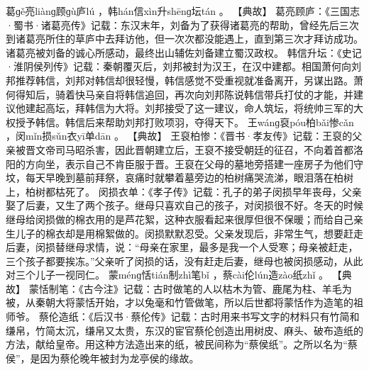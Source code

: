 \documentclass[12pt,UTF8]{ctexbook}
\begin{document}
葛ɡě亮liànɡ顾ɡù庐lú
，韩hán信xìn升shēnɡ坛tán
。
【典故】
葛亮顾庐：《三国志·蜀书·诸葛亮传》记载：东汉末年，刘备为了获得诸葛亮的帮助，曾经先后三次到诸葛亮所住的草庐中去拜访他，但一次次都没能遇上，直到第三次才拜访成功。诸葛亮被刘备的诚心所感动，最终出山辅佐刘备建立蜀汉政权。
韩信升坛：《史记·淮阴侯列传》记载：秦朝覆灭后，刘邦被封为汉王，在汉中建都。相国萧何向刘邦推荐韩信，刘邦对韩信却很轻慢，韩信感觉不受重视就准备离开，另谋出路。萧何得知后，骑着快马亲自将韩信追回，再次向刘邦陈说韩信带兵打仗的才能，并建议他建起高坛，拜韩信为大将。刘邦接受了这一建议，命人筑坛，将统帅三军的大权授予韩信。韩信后来帮助刘邦打败项羽，夺得天下。
王wánɡ裒póu柏bǎi惨cǎn
，闵mǐn损sǔn衣yī单dān
。
【典故】
王裒柏惨：《晋书·孝友传》记载：王裒的父亲被晋文帝司马昭杀害，因此晋朝建立后，王裒不接受朝廷的征召，不向着首都洛阳的方向坐，表示自己不肯臣服于晋。王裒在父母的墓地旁搭建一座房子为他们守坟，每天早晚到墓前拜祭，哀痛时就攀着墓旁边的柏树痛哭流涕，眼泪落在柏树上，柏树都枯死了。
闵损衣单：《孝子传》记载：孔子的弟子闵损早年丧母，父亲娶了后妻，又生了两个孩子。继母只喜欢自己的孩子，对闵损很不好。冬天的时候继母给闵损做的棉衣用的是芦花絮，这种衣服看起来很厚但很不保暖；而给自己亲生儿子的棉衣却是用棉絮做的。闵损默默忍受。父亲发现后，非常生气，想要赶走后妻，闵损替继母求情，说：“母亲在家里，最多是我一个人受寒；母亲被赶走，三个孩子都要挨冻。”父亲听了闵损的话，没有赶走后妻，继母也被闵损感动，从此对三个儿子一视同仁。
蒙ménɡ恬tián制zhì笔bǐ
，蔡cài伦lún造zào纸zhǐ
。
【典故】
蒙恬制笔：《古今注》记载：古时做笔的人以枯木为管、鹿尾为柱、羊毛为被，从秦朝大将蒙恬开始，才以兔毫和竹管做笔，所以后世都将蒙恬作为造笔的祖师爷。
蔡伦造纸：《后汉书·蔡伦传》记载：古时用来书写文字的材料只有竹简和缣帛，竹简太沉，缣帛又太贵，东汉的宦官蔡伦创造出用树皮、麻头、破布造纸的方法，献给皇帝。用这种方法造出来的纸，被民间称为“蔡侯纸”。之所以名为“蔡侯”，是因为蔡伦晚年被封为龙亭侯的缘故。
\end{document}
